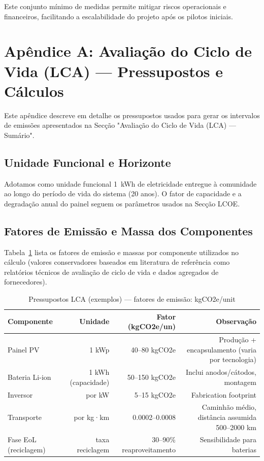 \documentclass[12pt, a4paper]{article}
\begin{document}
\begin{itemize}
\noindent Este conjunto mínimo de medidas permite mitigar riscos operacionais e financeiros,
facilitando a escalabilidade do projeto após os pilotos iniciais.

\clearpage
\appendix
\section{Apêndice A: Avaliação do Ciclo de Vida (LCA) — Pressupostos e Cálculos}
\label{app:lca}

Este apêndice descreve em detalhe os pressupostos usados para gerar os intervalos de
emissões apresentados na Secção "Avaliação do Ciclo de Vida (LCA) — Sumário".

\subsection{Unidade Funcional e Horizonte}
Adotamos como unidade funcional 1~kWh de eletricidade entregue à comunidade ao longo do
período de vida do sistema (20 anos). O fator de capacidade e a degradação anual do painel
seguem os parâmetros usados na Secção LCOE.

\subsection{Fatores de Emissão e Massa dos Componentes}
Tabela~\ref{tab:lca_assumptions} lista os fatores de emissão e massas por componente
utilizados no cálculo (valores conservadores baseados em literatura de referência como
relatórios técnicos de avaliação de ciclo de vida e dados agregados de fornecedores).

\begin{table}[H]
\centering
\caption{Pressupostos LCA (exemplos) — fatores de emissão: kgCO2e/unit}
\label{tab:lca_assumptions}
\footnotesize
\begin{tabular}{@{}lrrr@{}}
\toprule
\textbf{Componente} & \textbf{Unidade} & \textbf{Fator (kgCO2e/un)} & \textbf{Observação} \\
\midrule
Painel PV & 1 kWp & 40--80 kgCO2e & Produção + encapsulamento (varia por tecnologia) \\
Bateria Li-ion & 1 kWh (capacidade) & 50--150 kgCO2e & Inclui anodos/cátodos, montagem \\
Inversor & por kW & 5--15 kgCO2e & Fabrication footprint \\
Transporte & por kg·km & 0.0002--0.0008 & Caminhão médio, distância assumida 500--2000 km \\
Fase EoL (reciclagem) & taxa reciclagem & 30--90\% reaproveitamento & Sensibilidade para baterias \\
\bottomrule
\end{tabular}
\end{table}


\end{itemize}
\end{document}
